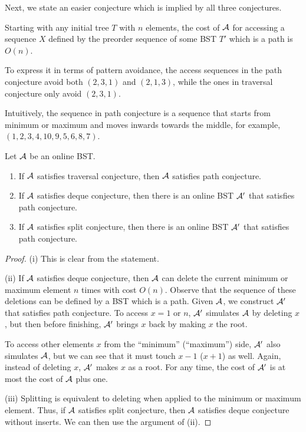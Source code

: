 Next, we state an easier conjecture which is implied by all three
conjectures.
\begin{conjecture}
	Starting with any initial tree $T$ with $n$ elements,
	the cost of ${\mathcal{A}}$ for accessing a sequence $X$ defined by the preorder sequence
	of some BST $T'$ which is a path is $O(n)$.
\end{conjecture}

To express it in terms of pattern avoidance,
the access sequences in the path conjecture avoid both $(2,3,1)$ and
$(2,1,3)$, while the ones in traversal conjecture only avoid $(2,3,1)$. 

Intuitively, the sequence in path conjecture is a sequence that starts
from minimum or maximum and moves inwards towards the middle, for example,
$(1,2,3,4,10,9,5,6,8,7)$.

\begin{theorem}
	Let ${\mathcal{A}}$ be an online BST.
	\begin{enumerate}[label={{(}\roman*{)}}]
\item If ${\mathcal{A}}$ satisfies traversal conjecture, then ${\mathcal{A}}$ satisfies path
		conjecture. 
		\item If ${\mathcal{A}}$ satisfies deque conjecture, then there is an online BST
		${\mathcal{A}}'$ that satisfies path conjecture. 
		\item If ${\mathcal{A}}$ satisfies split conjecture, then there is an online BST ${\mathcal{A}}'$ that satisfies path conjecture.  		
		
	\end{enumerate}
\end{theorem}
\begin{proof}
		(i) This is clear from the statement.
		
	(ii) If ${\mathcal{A}}$ satisfies deque conjecture, then ${\mathcal{A}}$ can delete
	the current minimum or maximum element $n$ times with cost $O(n)$.
	Observe that the sequence of these deletions can be defined by a BST
	which is a path. Given ${\mathcal{A}}$, we construct ${\mathcal{A}}'$ that satisfies path
	conjecture. To access $x=1$ or $n$, ${\mathcal{A}}'$ simulates ${\mathcal{A}}$ by deleting
	$x$, but then before finishing, ${\mathcal{A}}'$ brings $x$ back by making $x$ the root.
	
	To access other elements $x$ from the ``minimum'' (``maximum'')
	side, ${\mathcal{A}}'$ also simulates ${\mathcal{A}}$, but we can see that it must touch
	$x-1$ ($x+1$) as well. Again, instead of deleting $x$, ${\mathcal{A}}'$
	makes $x$ as a root. For any time, the cost of ${\mathcal{A}}'$ is at most the
	cost of ${\mathcal{A}}$ plus one. 
	


(iii) Splitting is equivalent to deleting when applied to
	the minimum or maximum element. Thus, if ${\mathcal{A}}$ satisfies split conjecture, then ${\mathcal{A}}$ satisfies deque conjecture without inserts. We can then use the argument of (ii).
	\end{proof}
